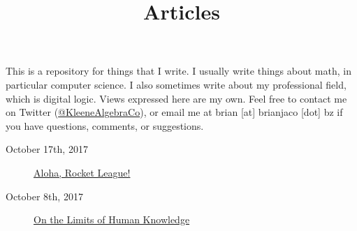 \documentclass{article}
\title{Articles}
\date{}
\begin{document}
\maketitle

This is a repository for things that I write. I usually write things about math, in particular computer science. I also sometimes write about my professional field, which is digital logic. Views expressed here are my own. Feel free to contact me on Twitter (\href{https://twitter.com/KleeneAlgebraCo}{@KleeneAlgebraCo}), or email me at brian [at] brianjaco [dot] bz if you have questions, comments, or suggestions.

\begin{description}
\item[October 17th, 2017] \href{aloha-rocket-league/index.html}{Aloha, Rocket League!}
\item[October 8th, 2017] \href{limits-of-human-knowledge/index.html}{On the Limits of Human Knowledge}
\end{description}
\end{document}
